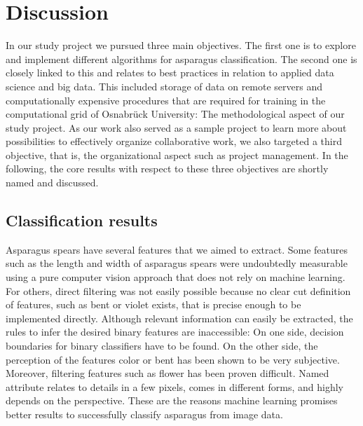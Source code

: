 \section{Discussion}
\label{ch:Discussion}

In our study project we pursued three main objectives. The first one is to explore and implement different algorithms for asparagus classification. The second one is closely linked to this and relates to best practices in relation to applied data science and big data. This included storage of data on remote servers and computationally expensive procedures that are required for training in the computational grid of Osnabr{\"u}ck University: The methodological aspect of our study project. As our work also served as a sample project to learn more about possibilities to effectively organize collaborative work, we also targeted a third objective, that is, the organizational aspect such as project management. In the following, the core results with respect to these three objectives are shortly named and discussed.


\subsection{Classification results}
\label{sec:DiscussionResults}

Asparagus spears have several features that we aimed to extract. Some features such as the length and width of asparagus spears were undoubtedly measurable using a pure computer vision approach that does not rely on machine learning. For others, direct filtering was not easily possible because no clear cut definition of features, such as bent or violet exists, that is precise enough to be implemented directly. Although relevant information can easily be extracted, the rules to infer the desired binary features are inaccessible: On one side, decision boundaries for binary classifiers have to be found. On the other side, the perception of the features color or bent has been shown to be very subjective. Moreover, filtering features such as flower has been proven difficult. Named attribute relates to details in a few pixels, comes in different forms, and highly depends on the perspective. These are the reasons machine learning promises better results to successfully classify asparagus from image data.

